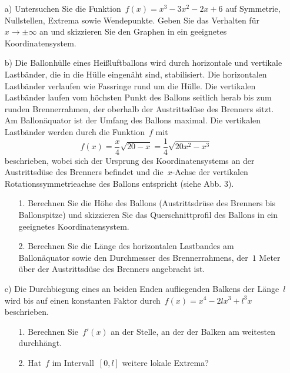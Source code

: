 \begin{itemize}
	\item[a)] Untersuchen Sie die Funktion~$f(x)=x^3-3x^2-2x+6$ auf Symmetrie, Nullstellen, Extrema sowie Wendepunkte. Geben Sie das Verhalten für~$x\to \pm \infty$ an und skizzieren Sie den Graphen in ein geeignetes Koordinatensystem.
	\item[b)] Die Ballonhülle eines Heißluftballons wird durch horizontale und vertikale Lastbänder, die in die Hülle eingenäht sind, stabilisiert. Die horizontalen Lastbänder verlaufen wie Fassringe rund um die Hülle. Die vertikalen Lastbänder laufen vom höchsten Punkt des Ballons seitlich herab bis zum runden Brennerrahmen, der oberhalb der Austrittsdüse des Brenners sitzt. Am Ballonäquator ist der Umfang des Ballons maximal.
	Die vertikalen Lastbänder werden durch die Funktion~$f$ mit
	\begin{equation*}
		f(x)= \frac{x}{4}\sqrt{20-x} = \frac{1}{4}\sqrt{20x^2 - x^3}
	\end{equation*}
	beschrieben, wobei sich der Ursprung des Koordinatensystems an der Austrittsdüse des Brenners befindet und die~$x$-Achse der vertikalen Rotationssymmetrieachse des Ballons entspricht (siehe Abb. 3).
	\begin{itemize}
		\item[1.] Berechnen Sie die Höhe des Ballons (Austrittsdrüse des Brenners bis Ballonspitze) und skizzieren Sie das Querschnittprofil des Ballons in ein geeignetes Koordinatensystem.
		\item[2.] Berechnen Sie die Länge des horizontalen Lastbandes am Ballonäquator sowie den Durchmesser des Brennerrahmens, der~$1$ Meter über der Austrittsdüse des Brenners angebracht ist.
	\end{itemize}
	\item[c)] Die Durchbiegung eines an beiden Enden aufliegenden Balkens der Länge~$l$ wird bis auf einen konstanten Faktor durch~$f(x)=x^4 - 2lx^3 + l^3x$ beschrieben.
	\begin{itemize}
		\item[1.] Berechnen Sie~$f'(x)$ an der Stelle, an der der Balken am weitesten durchhängt.
		\item[2.] Hat~$f$ im Intervall~$\left[0,l\right]$ weitere lokale Extrema?
	\end{itemize}
\end{itemize}
